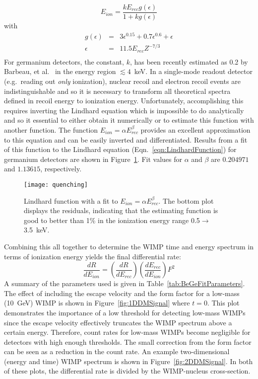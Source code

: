 		\begin{equation}
			E_{ion} =  \frac{k E_{rec} g(\epsilon)}{1 + k g(\epsilon)}
			\label{eqn:LindhardFunction}
		\end{equation}
with 
		\begin{eqnarray*}
			g(\epsilon) & = & 3 \epsilon^{0.15} + 0.7\epsilon^{0.6} + \epsilon \\		
			\epsilon & = & 11.5 E_{rec} Z^{-7/3} \\
		\end{eqnarray*}
For germanium detectors, the constant, $k$, has been recently estimated as 0.2 by Barbeau, et al.~\cite{Barbeau:2009fk} in the energy region $\lesssim4$~keV.  In a single-mode readout detector (e.g.~reading out \emph{only} ionization), nuclear recoil and electron recoil events are indistinguishable and so it is necessary to transform all theoretical spectra defined in recoil energy to ionization energy.  Unfortunately, accomplishing this requires inverting the Lindhard equation which is impossible to do analytically and so it essential to either obtain it numerically or to estimate this function with another function.  The function $E_{ion} =  \alpha E_{rec}^{\beta}$ provides an excellent approximation to this equation and can be easily inverted and differentiated.  Results from a fit of this function to the Lindhard equation (Eqn.~\ref{eqn:LindhardFunction}) for germanium detectors are shown in Figure~\ref{fig:LindhardFitResults}.  Fit values for $\alpha$ and $\beta$ are $0.204971$ and $1.13615$, respectively.

		\begin{figure}
			\centering
			\texttt{[image: quenching]}
			\caption[Lindhard function with a fit to $E_{ion} =  \alpha E_{rec}^{\beta}$]
			{Lindhard function with a fit to $E_{ion} =  \alpha E_{rec}^{\beta}$.  
			The bottom plot displays the residuals, 
			indicating that the estimating function is good to better than 1\% in the 
			ionization energy range 0.5$\to$3.5~keV.}
			\label{fig:LindhardFitResults}
		\end{figure}
Combining this all together to determine the WIMP time and energy spectrum in terms of ionization energy yields the final differential rate:
		\begin{equation}
				\frac{dR}{dE_{ion}}  = \left(\frac{dR}{dE_{rec}} \right) \left(\frac{dE_{rec}}{dE_{ion}} \right) F^{2}
			\label{eqn:FinalFitSpectrum}
		\end{equation}	
A summary of the parameters used is given in Table~\ref{tab:BeGeFitParameters}.  The effect of including the escape velocity and the form factor for a low-mass (10~GeV) WIMP is shown in Figure~\ref{fig:1DDMSignal} where $t=0$.  This plot demonstrates the importance of a low threshold for detecting low-mass WIMPs since the escape velocity effectively truncates the WIMP spectrum above a certain energy.  Therefore, count rates for low-mass WIMPs become negligible for detectors with high enough thresholds.  The small correction from the form factor can be seen as a reduction in the count rate.  An example two-dimensional (energy and time) WIMP spectrum is shown in Figure~\ref{fig:2DDMSignal}.  In both of these plots, the differential rate is divided by the WIMP-nucleus cross-section.


